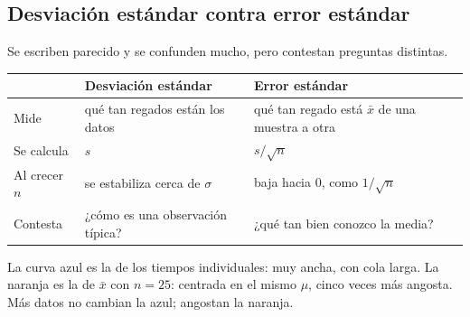 \documentclass[11pt,letterpaper]{article}
\begin{document}

\subsection*{Desviación estándar contra error estándar}

Se escriben parecido y se confunden mucho, pero contestan preguntas
distintas.

\begin{center}
\small
\begin{tabular}{l>{\raggedright\arraybackslash}p{5cm}%
                 >{\raggedright\arraybackslash}p{5cm}}
    \toprule
    & \textbf{Desviación estándar} & \textbf{Error estándar} \\
    \midrule
    Mide & qué tan regados están los datos
         & qué tan regado está $\bar{x}$ de una muestra a otra \\
    \addlinespace
    Se calcula & $s$ & $s / \sqrt{n}$ \\
    \addlinespace
    Al crecer $n$ & se estabiliza cerca de $\sigma$
                  & baja hacia $0$, como $1 / \sqrt{n}$ \\
    \addlinespace
    Contesta & ¿cómo es una observación típica?
             & ¿qué tan bien conozco la media? \\
    \bottomrule
\end{tabular}
\end{center}

\begin{center}
\end{center}

La curva azul es la de los tiempos individuales: muy ancha, con cola
larga. La naranja es la de $\bar{x}$ con $n = 25$: centrada en el
mismo $\mu$, cinco veces más angosta. Más datos no cambian la azul;
angostan la naranja.
\end{document}
